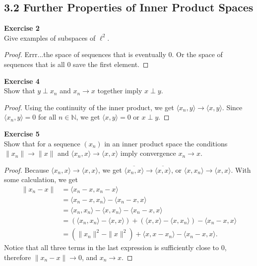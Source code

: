 \documentclass[12pt, a4paper]{article}
\theoremstyle{plain}
\newcommand{\N}{\mathbb{N}}
\newenvironment{exercise}[2][Exercise]
    { \begin{mdframed}[backgroundcolor=gray!20] \textbf{#1 #2} \\}
    {  \end{mdframed}}
\begin{document}
\subsection*{3.2 Further Properties of Inner Product Spaces}

\begin{exercise}{2}
Give examples of subspaces of $\ell^2$.
\end{exercise}
	\begin{proof}
	Errr...the space of sequences that is eventually $0$. Or the space of sequences that is all $0$ save the first element.	
	\end{proof}

\begin{exercise}{4}
Show that $y\perp x_n$ and $x_n\rightarrow x$ together imply $x\perp y$.
\end{exercise}
	\begin{proof}
	Using the continuity of the inner product, we get $\langle{x_n,y}\rangle \rightarrow \langle{x,y}\rangle$. Since $\langle{x_n,y}\rangle = 0$ for all $n\in \N$, we get $\langle{x,y}\rangle = 0$ or $x\perp y$.
	\end{proof}

\begin{exercise}{5}
Show that for a sequence $(x_n)$ in an inner product space the conditions $\|x_n\|\rightarrow \|x\|$ and $\langle{x_n,x}\rangle\rightarrow \langle{x,x}\rangle$ imply convergence $x_n\rightarrow x$.
\end{exercise}
\begin{proof}
Because $\langle{x_n,x}\rangle\rightarrow \langle{x,x}\rangle$, we get $\overline{\langle{x_n,x}\rangle}\rightarrow \overline{\langle{x,x}\rangle}$, or $\langle{x,x_n}\rangle \rightarrow \langle{x,x}\rangle$. With some calculation, we get
	\begin{align*}
	\|x_n-x\| &= \langle{x_n-x,x_n-x}\rangle\\
	&= \langle{x_n-x,x_n}\rangle - \langle{x_n-x,x}\rangle\\
	&= \langle{x_n,x_n}\rangle - \langle{x,x_n}\rangle - \langle{x_n-x,x}\rangle\\
	&= (\langle{x_n,x_n}\rangle -\langle{x,x}\rangle) + (\langle{x,x}\rangle- \langle{x,x_n}\rangle) - \langle{x_n-x,x}\rangle\\
	&= (\|x_n\|^2-\|x\|^2) + \langle{x,x-x_n}\rangle - \langle{x_n-x,x}\rangle.
	\end{align*}
	Notice that all three terms in the last expression is sufficiently close to $0$, therefore $\|x_n-x\|\rightarrow 0$, and $x_n\rightarrow x$.

\end{proof}
	
\end{document}
